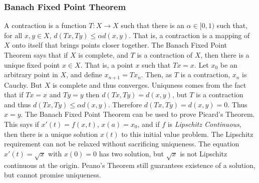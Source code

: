 \documentclass[crop=false,class=article,oneside]{standalone}
\begin{document}
        \subsubsection{Banach Fixed Point Theorem}
            A contraction is a function
            $T:X\rightarrow{X}$ such that there is an
            $\alpha\in[0,1)$ such that, for all
            $x,y\in{X}$, $d(Tx,Ty)\leq\alpha{d}(x,y)$. That is,
            a contraction is a mapping of $X$ onto itself that
            brings points closer together. The Banach Fixed Point
            Theorem says that if $X$ is complete, and $T$ is a
            contraction of $X$, then there is a unique fixed point
            $x\in{X}$. That is, a point $x$ such that $Tx=x$.
            Let $x_{0}$ be an arbitrary point in $X$, and define
            $x_{n+1}=Tx_{n}$. Then, as $T$ is a contraction,
            $x_{n}$ is Cauchy. But $X$ is complete and thus
            converges. Uniquness comes from the fact that
            if $Tx=x$ and $Ty=y$ then
            $d(Tx,Ty)=d(x,y)$, but $T$ is a contraction
            and thus $d(Tx,Ty)\leq\alpha{d}(x,y)$. Therefore
            $d(Tx,Ty)=d(x,y)=0$. Thus $x=y$. The Banach Fixed
            Point Theorem can be used to prove
            Picard's Theorem. This says if $x'(t)=f(x,t)$,
            $x(a)=x_{0}$, and if $f$ is
            \textit{Lipschitz Continuous}, then there is
            a unique solution $x(t)$ to this initial value
            problem. The Lipschitz requirement can not be
            relaxed without sacrificing uniqueness. The
            equation $x'(t)=\sqrt{x}$ with $x(0)=0$ has
            two solution, but $\sqrt{x}$ is not Lipschitz
            continuous at the origin. Peano's Theorem
            still guarantees existence of a solution, but
            cannot promise uniqueness.
\end{document}
